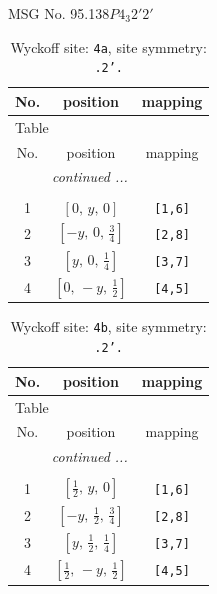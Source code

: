 \documentclass[fleqn,8pt]{jsarticle}
\begin{document}
\setcounter{MaxMatrixCols}{32}

\renewcommand{\tablename}{Table~}
\renewcommand{\figurename}{Figure~}
\begin{center}
\LARGE
MSG No. 95.138\quad$P4_{3}2'2'$
\end{center}
\renewcommand{\arraystretch}{1.2}
\begin{longtable}{ccc}
\caption{Wyckoff site: {\tt 4a}, site symmetry: {\tt .2'.}}
 \\
 \hline \hline
No. & position & mapping \\ \hline \endfirsthead

\multicolumn{2}{l}{\tablename\ \thetable{}} \\
 \hline \hline
No. & position & mapping \\ \hline \endhead

 \hline \hline
\multicolumn{2}{r}{\footnotesize\it continued ...} \\ \endfoot

 \hline \hline
\multicolumn{2}{r}{} \\ \endlastfoot

1 & $\left[ 0,\, y,\, 0 \right]$ & {\tt [1,6]} \\ \hline
2 & $\left[ - y,\, 0,\, \frac{3}{4} \right]$ & {\tt [2,8]} \\ \hline
3 & $\left[ y,\, 0,\, \frac{1}{4} \right]$ & {\tt [3,7]} \\ \hline
4 & $\left[ 0,\, - y,\, \frac{1}{2} \right]$ & {\tt [4,5]} \\
\end{longtable}
\renewcommand{\arraystretch}{1.2}
\begin{longtable}{ccc}
\caption{Wyckoff site: {\tt 4b}, site symmetry: {\tt .2'.}}
 \\
 \hline \hline
No. & position & mapping \\ \hline \endfirsthead

\multicolumn{2}{l}{\tablename\ \thetable{}} \\
 \hline \hline
No. & position & mapping \\ \hline \endhead

 \hline \hline
\multicolumn{2}{r}{\footnotesize\it continued ...} \\ \endfoot

 \hline \hline
\multicolumn{2}{r}{} \\ \endlastfoot

1 & $\left[ \frac{1}{2},\, y,\, 0 \right]$ & {\tt [1,6]} \\ \hline
2 & $\left[ - y,\, \frac{1}{2},\, \frac{3}{4} \right]$ & {\tt [2,8]} \\ \hline
3 & $\left[ y,\, \frac{1}{2},\, \frac{1}{4} \right]$ & {\tt [3,7]} \\ \hline
4 & $\left[ \frac{1}{2},\, - y,\, \frac{1}{2} \right]$ & {\tt [4,5]} \\
\end{longtable}
\end{document}
